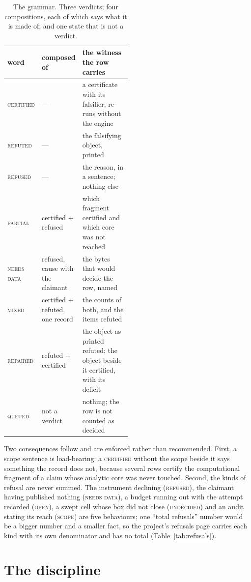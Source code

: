 \documentclass[11pt]{article}
\theoremstyle{plain}
\theoremstyle{definition}
\begin{document}
\begin{table}[h]\centering\small
\begin{tabular}{@{}llp{0.5\linewidth}@{}}\toprule
word & composed of & the witness the row carries \\\midrule
\textsc{certified} & --- & a certificate with its falsifier; re-runs without the engine \\
\textsc{refuted} & --- & the falsifying object, printed \\
\textsc{refused} & --- & the reason, in a sentence; nothing else \\
\textsc{partial} & certified $+$ refused & which fragment certified and which core was not reached \\
\textsc{needs data} & refused, cause with the claimant & the bytes that would decide the row, named \\
\textsc{mixed} & certified $+$ refuted, one record & the counts of both, and the items refuted \\
\textsc{repaired} & refuted $+$ certified & the object as printed refuted; the object beside it certified, with its deficit \\
\textsc{queued} & not a verdict & nothing; the row is not counted as decided \\
\bottomrule\end{tabular}
\caption{The grammar. Three verdicts; four compositions, each of which says what it is made of; and one state that is not a verdict.}\label{tab:grammar}
\end{table}

Two consequences follow and are enforced rather than recommended. First, a scope sentence is load-bearing: a \textsc{certified} without the scope beside it says something the record does not, because several rows certify the computational fragment of a claim whose analytic core was never touched. Second, the kinds of refusal are never summed. The instrument declining (\textsc{refused}), the claimant having published nothing (\textsc{needs data}), a budget running out with the attempt recorded (\textsc{open}), a swept cell whose box did not close (\textsc{undecided}) and an audit stating its reach (\textsc{scope}) are five behaviours; one ``total refusals'' number would be a bigger number and a smaller fact, so the project's refusals page carries each kind with its own denominator and has no total (Table~\ref{tab:refusals}).

\section{The discipline}\label{sec:discipline}
\end{document}
